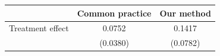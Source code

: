 \begin{threeparttable}
\begin{tabular}{l | c c}
 \toprule
 & Common practice & Our method \\
 \midrule
 Treatment effect & 0.0752 & 0.1417 \\
                  & (0.0380) & (0.0782) \\
\bottomrule
\end{tabular}
\end{threeparttable}

